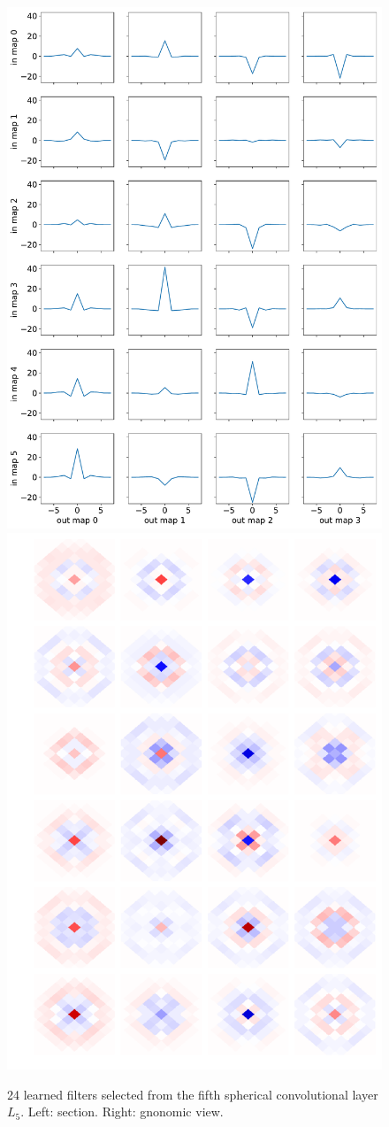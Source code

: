 \documentclass[final,twocolumn,3p,times,authoryear]{elsarticle}
\newcommand{\TK}[1]{{\color{red}{TK:#1}}}
\newcommand{\1}{\b{1}}              %
\newcommand{\0}{\b{0}}              %
\begin{document}
\begin{figure}
\centering
\includegraphics[width=0.47\linewidth]{section_filter_last}
\hfill
\includegraphics[width=0.45\linewidth]{gnonomic_filter_last}
\caption{24 learned filters selected from the fifth spherical convolutional layer $L_5$. Left: section. Right: gnonomic view.}
\label{fig:learned_filter}
\end{figure}


\end{document}
